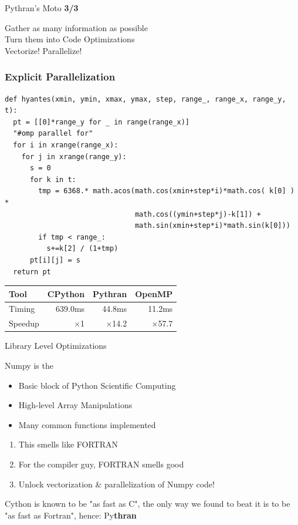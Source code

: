 \documentclass[aspectratio=1610]{beamer}
\begin{document}
\begin{frame}{Pythran's Moto \textbf{3/3}}
    \begin{center}
Gather as many information as possible\\
\vfill
Turn them into Code Optimizations\\
\vfill
\Large Vectorize! Parallelize!
\end{center}
\end{frame}

\begin{frame}[fragile]
    \frametitle{Explicit Parallelization}
            \begin{lstlisting}[basicstyle=\ttfamily\scriptsize]
def hyantes(xmin, ymin, xmax, ymax, step, range_, range_x, range_y, t):
  pt = [[0]*range_y for _ in range(range_x)]
  "#omp parallel for"
  for i in xrange(range_x):
    for j in xrange(range_y):
      s = 0
      for k in t:
        tmp = 6368.* math.acos(math.cos(xmin+step*i)*math.cos( k[0] ) *
                               math.cos((ymin+step*j)-k[1]) +
                               math.sin(xmin+step*i)*math.sin(k[0]))
        if tmp < range_:
          s+=k[2] / (1+tmp)
      pt[i][j] = s
  return pt
\end{lstlisting}
\vfill
    \begin{tabular}{|l|r|r|r|}
        \hline
     Tool    &  CPython    &   Pythran     & OpenMP   \\
    \hline
     Timing  &  639.0ms    &   44.8ms       &      11.2ms       \\
    \hline
     Speedup &  $\times$1         &    $\times$14.2      &    $\times$57.7   \\
    \hline
\end{tabular}
\end{frame}

\begin{frame}{Library Level Optimizations}
    \begin{block}{Numpy is the }
        \begin{itemize}
            \item Basic block of Python Scientific Computing
            \item High-level Array Manipulations
            \item Many common functions implemented
        \end{itemize}
    \end{block}
    \begin{enumerate}
        \item This smells like FORTRAN
        \item For the compiler guy, FORTRAN smells good
        \item Unlock vectorization \& parallelization of Numpy code!
    \end{enumerate}
    
    \vfill
    \begin{center}
    \scriptsize{Cython is known to be "as fast as C", the only way we found to beat it is to be "as fast as Fortran", hence: Py\textbf{thran}}
    \end{center}
    
\end{frame}
\end{document}
